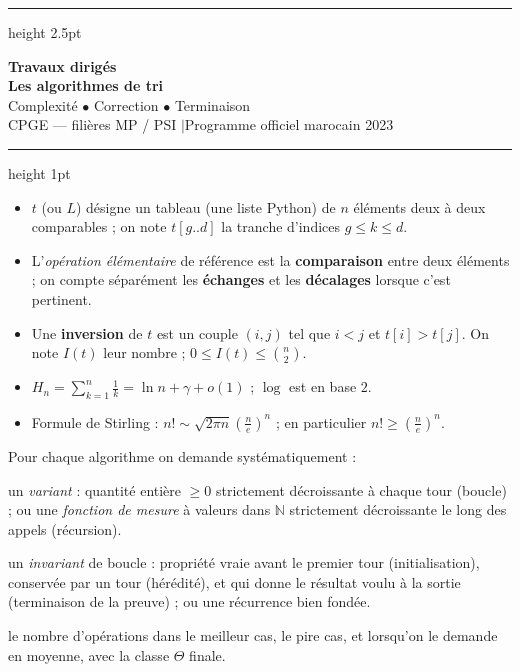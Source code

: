 \documentclass[11pt,a4paper]{article}
\begin{document}
\begin{center}
  {\color{teal}\hrule height 2.5pt}
  \vspace{10pt}
  {\Huge\bfseries\color{teal} Travaux dirigés}\\[6pt]
  {\LARGE\bfseries Les algorithmes de tri}\\[10pt]
  {\large Complexité \;$\bullet$\; Correction \;$\bullet$\; Terminaison}\\[8pt]
  {\normalsize CPGE --- filières MP / PSI \quad$|$\quad Programme officiel marocain 2023}\\[6pt]
  \vspace{6pt}
  {\color{teal}\hrule height 1pt}
\end{center}

\vspace{6pt}

\begin{rappel}[Conventions]
\begin{itemize}[leftmargin=*,itemsep=2pt]
  \item $t$ (ou $L$) désigne un tableau (une liste Python) de $n$ éléments deux à deux
        comparables ; on note $t[g..d]$ la tranche d'indices $g\le k\le d$.
  \item L'\emph{opération élémentaire} de référence est la \textbf{comparaison} entre
        deux éléments ; on compte séparément les \textbf{échanges} et les
        \textbf{décalages} lorsque c'est pertinent.
  \item Une \textbf{inversion} de $t$ est un couple $(i,j)$ tel que $i<j$ et $t[i]>t[j]$.
        On note $I(t)$ leur nombre ; $0\le I(t)\le \binom n2$.
  \item $H_n=\sum_{k=1}^n \frac1k = \ln n + \gamma + o(1)$ ; $\log$ est en base $2$.
  \item Formule de Stirling : $n!\sim\sqrt{2\pi n}\left(\frac ne\right)^{n}$ ;
        en particulier $n!\ge \left(\frac ne\right)^{n}$.
\end{itemize}
\end{rappel}

\begin{rappel}
Pour chaque algorithme on demande systématiquement :
\begin{description}[leftmargin=1.4cm,style=nextline,itemsep=2pt]
  \item[Terminaison] un \emph{variant} : quantité entière $\ge0$ strictement
        décroissante à chaque tour (boucle) ; ou une \emph{fonction de mesure} à valeurs
        dans $\mathbb N$ strictement décroissante le long des appels (récursion).
  \item[Correction] un \emph{invariant} de boucle : propriété vraie avant le premier
        tour (initialisation), conservée par un tour (hérédité), et qui donne le résultat
        voulu à la sortie (terminaison de la preuve) ; ou une récurrence bien fondée.
  \item[Complexité] le nombre d'opérations dans le meilleur cas, le pire cas, et
        lorsqu'on le demande en moyenne, avec la classe $\Theta$ finale.
\end{description}
\end{rappel}
\end{document}
